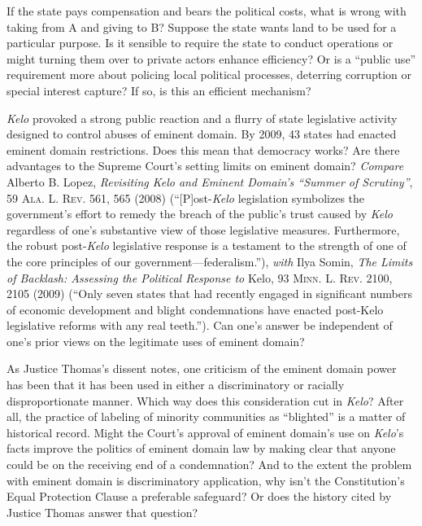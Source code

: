 
\item If the state pays compensation and bears the political costs, what is
wrong with taking from A and giving to B? Suppose the state wants land to be
used for a particular purpose. Is it sensible to require the state to conduct
operations or might turning them over to private actors enhance efficiency? Or
is a ``public use'' requirement more about policing local political processes,
deterring corruption or special interest capture? If so, is this an efficient
mechanism? 

\item \textit{Kelo} provoked a strong public reaction and a flurry of state
legislative activity designed to control abuses of eminent domain. By 2009, 43
states had enacted eminent domain restrictions. Does this mean that democracy
works? Are there advantages to the Supreme Court's setting limits on eminent
domain? \textit{Compare} Alberto B. Lopez, \textit{Revisiting Kelo and Eminent
Domain's ``Summer of Scrutiny''}, 59 \textsc{Ala. L. Rev.} 561, 565 (2008)
(``[P]ost-\textit{Kelo} legislation symbolizes the government's effort to remedy
the breach of the public's trust caused by \textit{Kelo} regardless of one's
substantive view of those legislative measures. Furthermore, the robust
post-\textit{Kelo} legislative response is a testament to the strength of one of
the core principles of our government---federalism.''), \textit{with} Ilya
Somin, \textit{The Limits of Backlash: Assessing the Political Response to}
Kelo, 93 \textsc{Minn. L. Rev}. 2100, 2105 (2009) (``Only seven states that had
recently engaged in significant numbers of economic development and blight
condemnations have enacted post-Kelo legislative reforms with any real
teeth.''). Can one's answer be independent of one's prior views on the
legitimate uses of eminent domain?

\item As Justice Thomas's dissent notes, one criticism of the eminent domain
power has been that it has been used in either a discriminatory or racially
disproportionate manner. Which way does this consideration cut in \textit{Kelo}?
After all, the practice of labeling of minority communities as ``blighted'' is a
matter of historical record. Might the Court's approval of eminent domain's use
on \textit{Kelo}'s facts improve the politics of eminent domain law by making
clear that anyone could be on the receiving end of a condemnation? And to the
extent the problem with eminent domain is discriminatory application, why isn't
the Constitution's Equal Protection Clause a preferable safeguard? Or does the
history cited by Justice Thomas answer that question?

